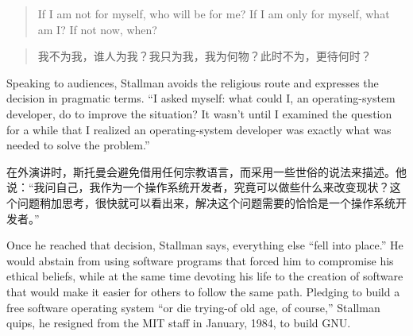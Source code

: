\ifdefined\eng
\begin{quote}
If I am not for myself, who will be for me? If I am only for myself, what am I? If not now, when?
\end{quote}
\fi

\ifdefined\chs
\begin{quote}
我不为我，谁人为我？我只为我，我为何物？此时不为，更待何时？
\end{quote}
\fi

\ifdefined\eng
Speaking to audiences, Stallman avoids the religious route and expresses the decision in pragmatic terms. ``I asked myself: what could I, an operating-system developer, do to improve the situation? It wasn't until I examined the question for a while that I realized an operating-system developer was exactly what was needed to solve the problem.''
\fi

\ifdefined\chs
在外演讲时，斯托曼会避免借用任何宗教语言，而采用一些世俗的说法来描述。他说：``我问自己，我作为一个操作系统开发者，究竟可以做些什么来改变现状？这个问题稍加思考，很快就可以看出来，解决这个问题需要的恰恰是一个操作系统开发者。''
\fi

\ifdefined\eng
\ifdefined\vone
Once he reached that decision, Stallman says, everything else ``fell into place.'' He would abstain from using software programs that forced him to compromise his ethical beliefs, while at the same time devoting his life to the creation of software that would make it easier for others to follow the same path. Pledging to build a free software operating system ``or die trying-of old age, of course,'' Stallman quips, he resigned from the MIT staff in January, 1984, to build GNU.
\fi

